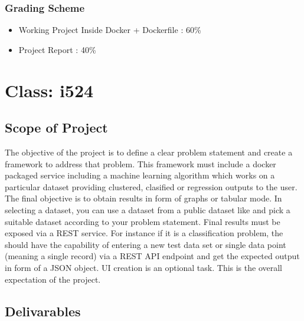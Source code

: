 \subsubsection{Grading Scheme}

\begin{itemize}
\item Working Project Inside Docker + Dockerfile : 60\%
\item Project Report : 40\%
\end{itemize}

\section{Class: i524}\label{s:i524-project}

\subsection{Scope of Project}

The objective of the project is to define a clear problem statement
and create a framework to address that problem. This framework must
include a docker packaged service including a machine learning
algorithm which works on a particular dataset providing clustered,
clasified or regression outputs to the user. The final objective is to
obtain results in form of graphs or tabular mode. In selecting a
dataset, you can use a dataset from a public dataset like
 and pick a suitable
dataset according to your problem statement. Final results must be
exposed via a REST service. For instance if it is a classification
problem, the should have the capability of entering a new test data
set or single data point (meaning a single record) via a REST API endpoint
and get the expected output in form of a JSON object. UI creation is an
optional task. This is the overall expectation of the project. 

\subsection{Delivarables}

